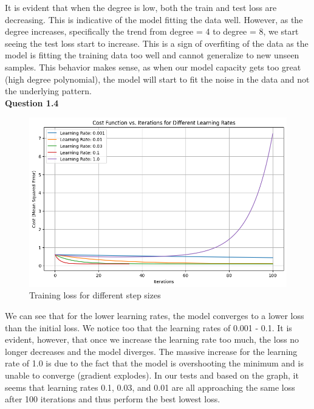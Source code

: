 \documentclass[12pt]{article}
\begin{document}
It is evident that when the degree is low, both the train and test loss are decreasing. This is indicative of the model fitting the data well. However, as the degree increases, specifically the trend from degree = 4 to degree = 8, we start seeing the test loss start to increase. 
This is a sign of overfiting of the data as the model is fitting the training data too well and cannot generalize to new unseen samples. This behavior makes sense, as when our model capacity gets too great (high degree polynomial), the model will start to fit the noise in the data and not the underlying pattern. \\

\textbf{Question 1.4} \\
\begin{figure}[H]
  \centering
  \includegraphics[width=\textwidth]{1_4.png}
  \caption{Training loss for different step sizes}
\end{figure} 


We can see that for the lower learning rates, the model converges to a lower loss than the initial loss. We notice too that the learning rates of 0.001 - 0.1. It is evident, however, that once we increase the learning rate too much, the loss 
no longer decreases and the model diverges. The massive increase for the learning rate of 1.0 is due to the fact that the model is overshooting the minimum and is unable to converge (gradient explodes). In our tests and based on the graph, it seems that learning rates 0.1, 0.03, and 0.01 are all approaching the same loss after 100 iterations and thus perform the best lowest loss. 
\end{document}
